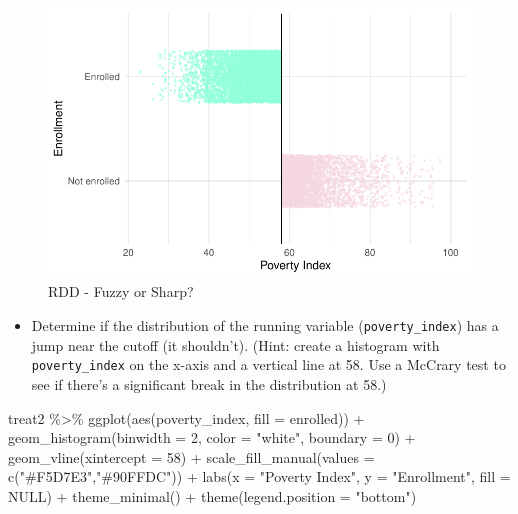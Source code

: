 \documentclass[
  letterpaper,
  DIV=11,
  numbers=noendperiod]{scrartcl}
\newenvironment{Shaded}{\begin{snugshade}}{\end{snugshade}}
\newcommand{\AttributeTok}[1]{\textcolor[rgb]{0.40,0.45,0.13}{#1}}
\newcommand{\ConstantTok}[1]{\textcolor[rgb]{0.56,0.35,0.01}{#1}}
\newcommand{\DecValTok}[1]{\textcolor[rgb]{0.68,0.00,0.00}{#1}}
\newcommand{\FunctionTok}[1]{\textcolor[rgb]{0.28,0.35,0.67}{#1}}
\newcommand{\NormalTok}[1]{\textcolor[rgb]{0.00,0.23,0.31}{#1}}
\newcommand{\SpecialCharTok}[1]{\textcolor[rgb]{0.37,0.37,0.37}{#1}}
\newcommand{\StringTok}[1]{\textcolor[rgb]{0.13,0.47,0.30}{#1}}
\providecommand{\tightlist}{%
  \setlength{\itemsep}{0pt}\setlength{\parskip}{0pt}}\usepackage{longtable,booktabs,array}
\begin{document}
\begin{figure}[H]

\caption{\label{fig-rdd1}RDD - Fuzzy or Sharp?}

{\centering \includegraphics{Jamie-Esmond_problem-set-8_files/figure-pdf/fig-rdd1-1.pdf}

}

\end{figure}

\begin{itemize}
\tightlist
\item
  Determine if the distribution of the running variable
  (\texttt{poverty\_index}) has a jump near the cutoff (it shouldn't).
  (Hint: create a histogram with \texttt{poverty\_index} on the x-axis
  and a vertical line at 58. Use a McCrary test to see if there's a
  significant break in the distribution at 58.)
\end{itemize}

\begin{Shaded}
\begin{Highlighting}[numbers=left,,]
\NormalTok{treat2 }\SpecialCharTok{\%\textgreater{}\%} 
  \FunctionTok{ggplot}\NormalTok{(}\FunctionTok{aes}\NormalTok{(poverty\_index, }\AttributeTok{fill =}\NormalTok{ enrolled)) }\SpecialCharTok{+}
    \FunctionTok{geom\_histogram}\NormalTok{(}\AttributeTok{binwidth =} \DecValTok{2}\NormalTok{, }\AttributeTok{color =} \StringTok{"white"}\NormalTok{, }\AttributeTok{boundary =} \DecValTok{0}\NormalTok{) }\SpecialCharTok{+}
    \FunctionTok{geom\_vline}\NormalTok{(}\AttributeTok{xintercept =} \DecValTok{58}\NormalTok{) }\SpecialCharTok{+}
    \FunctionTok{scale\_fill\_manual}\NormalTok{(}\AttributeTok{values =} \FunctionTok{c}\NormalTok{(}\StringTok{"\#F5D7E3"}\NormalTok{,}\StringTok{"\#90FFDC"}\NormalTok{)) }\SpecialCharTok{+}
    \FunctionTok{labs}\NormalTok{(}\AttributeTok{x =} \StringTok{"Poverty Index"}\NormalTok{,}
         \AttributeTok{y =} \StringTok{"Enrollment"}\NormalTok{,}
         \AttributeTok{fill =} \ConstantTok{NULL}\NormalTok{) }\SpecialCharTok{+}
    \FunctionTok{theme\_minimal}\NormalTok{() }\SpecialCharTok{+} 
    \FunctionTok{theme}\NormalTok{(}\AttributeTok{legend.position =} \StringTok{"bottom"}\NormalTok{)}
\end{Highlighting}
\end{Shaded}
\end{document}

